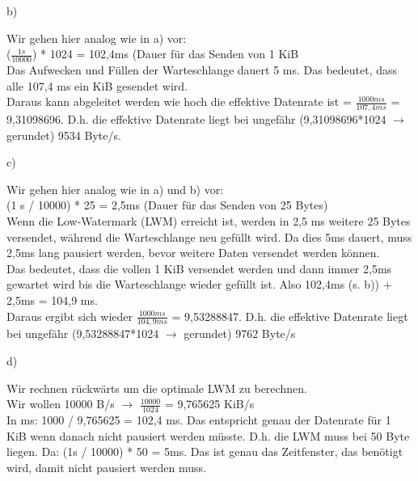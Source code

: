 \documentclass{ti2}
\begin{document}
b)

Wir gehen hier analog wie in a) vor:\\
($\frac{1 s}{10000}$) * 1024 = 102,4ms (Dauer für das Senden von 1 KiB\\
Das Aufwecken und Füllen der Warteschlange dauert 5 ms. Das bedeutet, dass alle 107,4 ms ein KiB gesendet wird.\\
Daraus kann abgeleitet werden wie hoch die effektive Datenrate ist = $\frac{1000ms}{107,4ms}$ = 9,31098696. D.h. die effektive Datenrate liegt bei ungefähr (9,31098696*1024 $\rightarrow$ gerundet) 9534 Byte/s.

c)

Wir gehen hier analog wie in a) und b) vor: \\
(1 s / 10000) * 25 = 2,5ms (Dauer für das Senden von 25 Bytes) \\
Wenn die Low-Watermark (LWM) erreicht ist, werden in 2,5 ms weitere 25 Bytes versendet, während die Warteschlange neu gefüllt wird. Da dies 5ms dauert, muss 2,5ms lang pausiert werden, bevor weitere Daten versendet werden können. \\
Das bedeutet, dass die vollen 1 KiB versendet werden und dann immer 2,5ms gewartet wird bis die Warteschlange wieder gefüllt ist. Also 102,4ms (s. b)) + 2,5ms = 104,9 ms. \\
Daraus ergibt sich wieder $\frac{1000ms}{104,9 ms}$ = 9,53288847. D.h. die effektive Datenrate liegt bei ungefähr (9,53288847*1024 $\rightarrow$ gerundet) 9762 Byte/s

d)

Wir rechnen rückwärts um die optimale LWM zu berechnen. \\
Wir wollen 10000 B/s $\rightarrow$ $\frac{10000}{1024}$ = 9,765625 KiB/s \\
In ms: 1000 / 9,765625 = 102,4 ms. Das entspricht genau der Datenrate für 1 KiB wenn danach nicht pausiert werden müsste. D.h. die LWM muss bei 50 Byte liegen. Da: (1s / 10000) * 50 = 5ms. Das ist genau das Zeitfenster, das benötigt wird, damit nicht pausiert werden muss.
\end{document}
